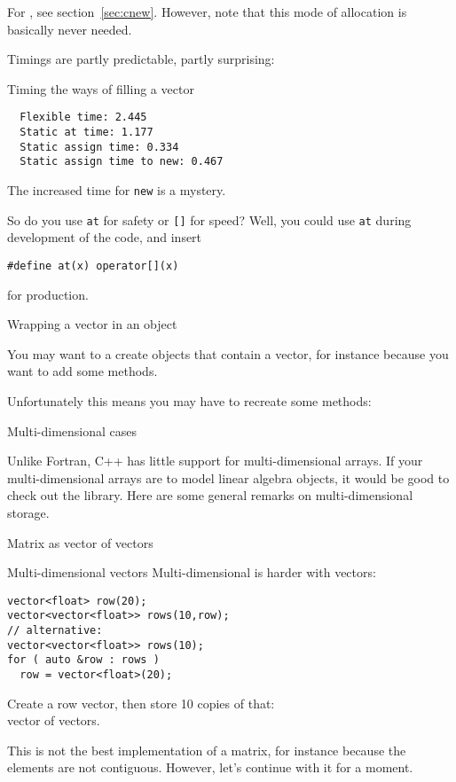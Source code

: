 For , see section~\ref{sec:cnew}. However, note that
this mode of allocation is basically never needed.

Timings are partly predictable, partly surprising:
\begin{block}{Timing the ways of filling a vector}
  \label{sl:vector-extend-time}
\begin{lstlisting}
  Flexible time: 2.445
  Static at time: 1.177
  Static assign time: 0.334
  Static assign time to new: 0.467
\end{lstlisting}
\end{block}

The increased time for \lstinline{new} is a mystery.

So do you use \lstinline{at} for safety or \lstinline{[]} for speed? Well, you could
use \lstinline{at} during development of the code, and insert
\begin{lstlisting}
#define at(x) operator[](x)
\end{lstlisting}
for production.

 {Wrapping a vector in an object}

You may want to a create objects that contain a vector, for instance
because you want to add some methods.
%

Unfortunately this means you may have to recreate some methods:
%

 {Multi-dimensional cases}

Unlike Fortran, C++ has little support for multi-dimensional
arrays. If your multi-dimensional arrays are to model linear algebra
objects, it would be good to check out the 
library. Here are some general remarks on multi-dimensional storage.

 {Matrix as vector of vectors}

\begin{block}{Multi-dimensional vectors}
  \label{sl:multi-vector}
  Multi-dimensional is harder with vectors:
\begin{lstlisting}
vector<float> row(20);
vector<vector<float>> rows(10,row);
// alternative:
vector<vector<float>> rows(10);
for ( auto &row : rows )
  row = vector<float>(20);
\end{lstlisting}
Create a row vector, then store 10 copies of that:\\
vector of vectors.
\end{block}

This is not the best implementation of a matrix, for instance because
the elements are not contiguous. However, let's continue with it for a moment.

